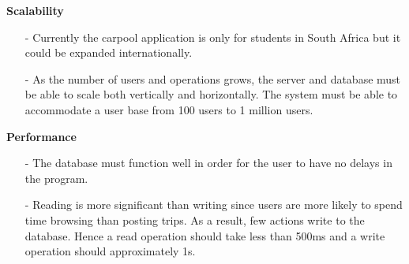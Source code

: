 \documentclass[hidelinks, 12pt, a4paper]{article}
\begin{document}
    \begin{changemargin}
    \large{ \textbf{Scalability}}
        \begin{itemize}
            \item[-] Currently the carpool application is only for students in South Africa but it could be expanded internationally. 
            \item[-] As the number of users and operations grows, the server and database must be able to scale both vertically and horizontally.  The system must be able to accommodate a user base from 100 users to 1 million users.
          \end{itemize} 
\vspace{0.5cm}
    \large{ \textbf{Performance}}
            \begin{itemize}
             \item[-] The database must function well in order for the user to have no delays in the program. 
             \item[-] Reading is more significant than writing since users are more likely to spend time browsing than posting trips. As a result, few actions write to the database. Hence a read operation should take less than 500ms and a write operation should approximately 1s.
             

\end{itemize}
\end{changemargin}
\end{document}
